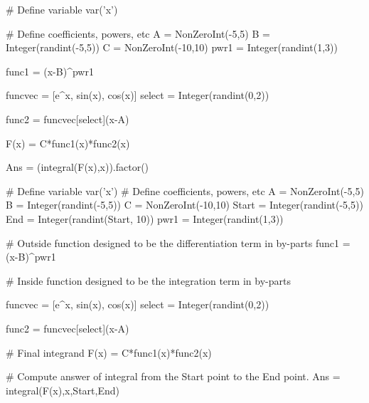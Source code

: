 \begin{sagesilent}
# Define variable
var('x')

# Define coefficients, powers, etc
A = NonZeroInt(-5,5)
B = Integer(randint(-5,5))
C = NonZeroInt(-10,10)
pwr1 = Integer(randint(1,3))

func1 = (x-B)^pwr1

funcvec = [e^x, sin(x), cos(x)]
select = Integer(randint(0,2))

func2 = funcvec[select](x-A)

F(x) = C*func1(x)*func2(x)

Ans = (integral(F(x),x)).factor()

\end{sagesilent}



\begin{sagesilent}
# Define variable
var('x')
# Define coefficients, powers, etc
A = NonZeroInt(-5,5)
B = Integer(randint(-5,5))
C = NonZeroInt(-10,10)
Start = Integer(randint(-5,5))
End = Integer(randint(Start, 10))
pwr1 = Integer(randint(1,3))

# Outside function designed to be the differentiation term in by-parts
func1 = (x-B)^pwr1

# Inside function designed to be the integration term in by-parts

funcvec = [e^x, sin(x), cos(x)]
select = Integer(randint(0,2))

func2 = funcvec[select](x-A)

# Final integrand
F(x) = C*func1(x)*func2(x)

# Compute answer of integral from the Start point to the End point.
Ans = integral(F(x),x,Start,End)

\end{sagesilent}



